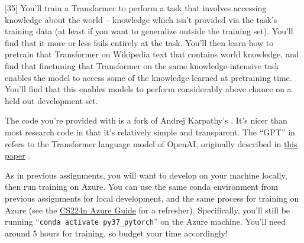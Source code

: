 \newcommand{\Real}{\mathbb{R}}
\newcommand{\Int}{\mathbb{Z}}

\newcommand{\henc}{\bh^{\text{enc}}}
\newcommand{\hencfw}[1]{\overrightarrow{\henc_{#1}}}
\newcommand{\hencbw}[1]{\overleftarrow{\henc_{#1}}}

\newcommand{\cenc}{\bc^{\text{enc}}}
\newcommand{\cencfw}[1]{\overrightarrow{\cenc_{#1}}}
\newcommand{\cencbw}[1]{\overleftarrow{\cenc_{#1}}}

\newcommand{\hdec}{\bh^{\text{dec}}}

\newcommand{\cdec}{\bc^{\text{dec}}}

\lstset{basicstyle=\ttfamily,columns=flexible,numbers=none}

[35]
\label{sec:char_enc}
You'll train a Transformer to perform a task that involves accessing knowledge about the world -- knowledge which isn't provided via the task's training data (at least if you want to generalize outside the training set). You'll find that it more or less fails entirely at the task.
You'll then learn how to pretrain that Transformer on Wikipedia text that contains world knowledge, and find that finetuning that Transformer on the same knowledge-intensive task enables the model to access some of the knowledge learned at pretraining time.
You'll find that this enables models to perform considerably above chance on a held out development set.

The code you're provided with is a fork of Andrej Karpathy's \href{https://github.com/karpathy/minGPT}{\mingpt}.
It's nicer than most research code in that it's relatively simple and transparent.
The ``GPT'' in \mingpt refers to the Transformer language model of OpenAI, originally described in \href{https://s3-us-west-2.amazonaws.com/openai-assets/research-covers/language-unsupervised/language_understanding_paper.pdf}{this paper} \cite{radford2018improving}.

As in previous assignments, you will want to develop on your machine locally, then run training on Azure. You can use the same conda environment from previous assignments for local development, and the same process for training on Azure (see the \href{https://docs.google.com/document/d/1BQOAjhBxWbywkB4rMFH9iinb6YHSjaWw1TOVlGfyYho}{CS224n Azure Guide} for a refresher). Specifically, you'll still be running ``\texttt{conda activate py37\_pytorch}'' on the Azure machine. You'll need around 5 hours for training, so budget your time accordingly!

